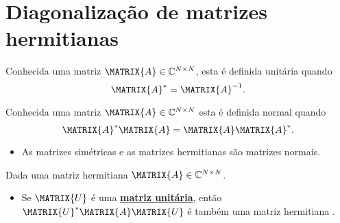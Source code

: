 \section{ Diagonalização de matrizes hermitianas}

\begin{definition}\label{def:unitarymatrix0}
Conhecida uma matriz $\MATRIX{A} \in \mathbb{C}^{N \times N}$, 
esta é definida unitária quando \cite[pp. 80]{golub2013matrix} 
\begin{equation}
\MATRIX{A}^{\ast} = \MATRIX{A}^{-1}.
\end{equation}
\end{definition}
\begin{definition}\label{def:normalmatrix0}
Conhecida uma matriz $\MATRIX{A} \in \mathbb{C}^{N \times N}$
esta é definida normal quando \cite[pp. 226]{hartfiel2000matrix} 
\begin{equation}
\MATRIX{A}^{\ast} \MATRIX{A}= \MATRIX{A} \MATRIX{A}^{\ast}.
\end{equation}
\end{definition}

\begin{tcbattention}
\begin{itemize}
\item As matrizes simétricas e as matrizes hermitianas são matrizes normais.
\end{itemize}
\end{tcbattention}

\begin{theorem}\label{theo:unitariahermitian0}
Dada uma matriz hermitiana $\MATRIX{A} \in \mathbb{C}^{N \times N}$.
\begin{itemize}
\item Se $\MATRIX{U}$ é uma \hyperref[def:unitarymatrix0]{\textbf{matriz unitária}}, 
então $\MATRIX{U}^{\ast} \MATRIX{A} \MATRIX{U}$ 
é também uma matriz hermitiana \cite[pp. 59]{axelsson1996iterative}.
\end{itemize}
\end{theorem}

